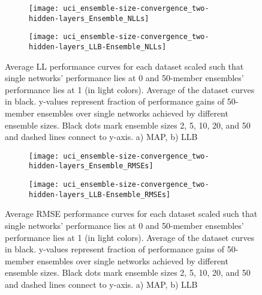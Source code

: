 \documentclass[../thesis.tex]{subfiles}
\begin{document}
\begin{figure}
    \centering
    \begin{subfigure}{0.49\textwidth}
        \texttt{[image: uci\_ensemble-size-convergence\_two-hidden-layers\_Ensemble\_NLLs]} 
        \caption{}
        \label{fig:uci-ensemble-sizes-ll-map}
    \end{subfigure}
    \begin{subfigure}{0.49\textwidth}
        \texttt{[image: uci\_ensemble-size-convergence\_two-hidden-layers\_LLB-Ensemble\_NLLs]} 
        \caption{}
        \label{fig:uci-ensemble-sizes-ll-llb}
    \end{subfigure}
    \caption{Average LL performance curves for each dataset scaled such that single networks' performance lies at 0 and 50-member ensembles' performance lies at 1 (in light colors). Average of the dataset curves in black. y-values represent fraction of performance gains of 50-member ensembles over single networks achieved by different ensemble sizes. Black dots mark ensemble sizes 2, 5, 10, 20, and 50 and dashed lines connect to y-axis. a) MAP, b) LLB }
    \label{fig:uci-ensemble-sizes-ll}
\end{figure}

\begin{figure}
    \centering
    \begin{subfigure}{0.49\textwidth}
        \texttt{[image: uci\_ensemble-size-convergence\_two-hidden-layers\_Ensemble\_RMSEs]} 
        \caption{}
        \label{fig:uci-ensemble-sizes-rmse-map}
    \end{subfigure}
    \begin{subfigure}{0.49\textwidth}
        \texttt{[image: uci\_ensemble-size-convergence\_two-hidden-layers\_LLB-Ensemble\_RMSEs]} 
        \caption{}
        \label{fig:uci-ensemble-sizes-rmse-llb}
    \end{subfigure}
    \caption{Average RMSE performance curves for each dataset scaled such that single networks' performance lies at 0 and 50-member ensembles' performance lies at 1 (in light colors). Average of the dataset curves in black. y-values represent fraction of performance gains of 50-member ensembles over single networks achieved by different ensemble sizes. Black dots mark ensemble sizes 2, 5, 10, 20, and 50 and dashed lines connect to y-axis. a) MAP, b) LLB }
    \label{fig:uci-ensemble-sizes-rmse}
\end{figure}
\end{document}
